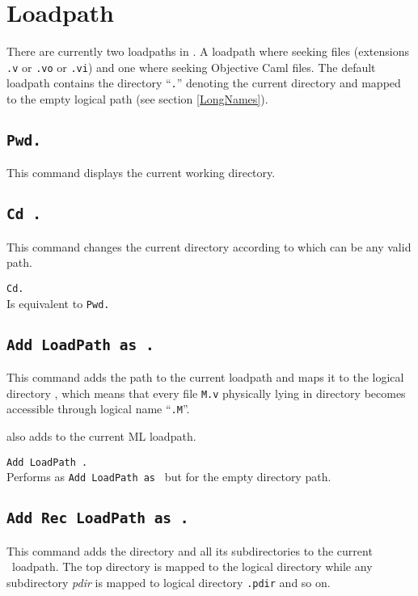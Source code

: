 \section{Loadpath}
\label{loadpath}

There are currently two loadpaths in \Coq. A loadpath where seeking
{\Coq} files (extensions {\tt .v} or {\tt .vo} or {\tt .vi}) and one where
seeking Objective Caml files. The default loadpath contains the
directory ``\texttt{.}'' denoting the current directory and mapped to the empty logical path (see section \ref{LongNames}).

\subsection{\tt Pwd.}\label{Pwd}
This command displays the current working directory.

\subsection{\tt Cd {\str}.}
This command changes the current directory according to {\str} 
which can be any valid path.

\begin{Variants}
\item {\tt Cd.}\\
  Is equivalent to {\tt Pwd.}
\end{Variants}

\subsection{\tt Add LoadPath {\str} as {\dirpath}.}
\label{AddLoadPath}

This command adds the path {\str} to the current {\Coq} loadpath and
maps it to the logical directory {\dirpath}, which means that every
file {\tt M.v} physically lying in directory {\str} becomes accessible
through logical name ``{\dirpath}{\tt{.M}}''. 

 also adds {\str} to the current ML loadpath.

\begin{Variants}
\item {\tt Add LoadPath {\str}.}\\
Performs as {\tt Add LoadPath {\str} as {\dirpath}} but for the empty directory path.
\end{Variants}

\subsection{\tt Add Rec LoadPath {\str} as {\dirpath}.}\label{AddRecLoadPath}
This command adds the directory {\str} and all its subdirectories 
to the current \Coq\ loadpath. The top directory {\str} is mapped to the logical directory {\dirpath} while any subdirectory {\textsl{pdir}} is mapped to logical directory {\dirpath}{\tt{.pdir}} and so on.


